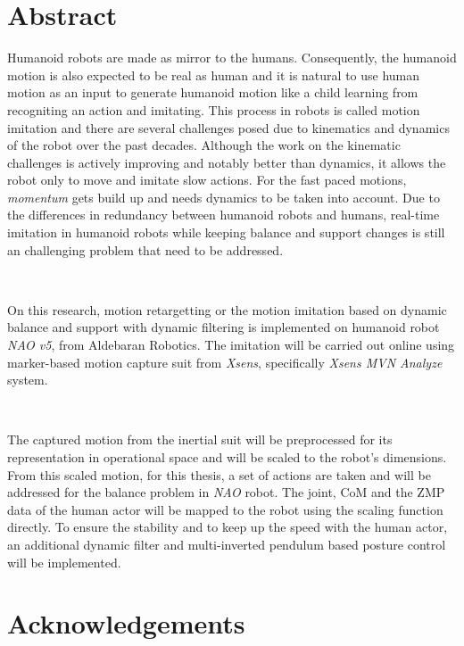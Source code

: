 \documentclass{thesisreport}
\begin{document}
   
 
  \section*{Abstract}
   
  Humanoid robots are made as mirror to the humans. Consequently, the humanoid motion is also expected to be real as 
  human and it is natural to use human motion as an input to generate humanoid motion like a child learning from recogniting
  an action and imitating. This process in robots is called motion imitation and there are several challenges posed 
  due to kinematics and dynamics of the robot over the past decades. Although the work on the kinematic challenges is 
  actively improving and notably better than dynamics, it allows the robot only to move and imitate slow actions. 
  For the fast paced motions, \textit{momentum} gets build up and needs dynamics to be taken into account. Due to the 
  differences in redundancy between humanoid robots and humans, real-time imitation in humanoid robots while keeping 
  balance and support changes is still an challenging problem that need to be addressed.

  ~
  
  On this research, motion retargetting or the motion imitation based on dynamic balance and support with dynamic filtering 
  is implemented on humanoid robot \textit{NAO v5}, from Aldebaran Robotics. The imitation will be carried out 
  online using marker-based motion capture suit from \textit{Xsens}, specifically \textit{Xsens MVN Analyze} system.
  
  ~
  
  The captured motion from the inertial suit will be preprocessed for its representation in operational space and will be 
  scaled to the robot's dimensions. From this scaled motion, for this thesis, a set of actions are taken and will be addressed
  for the balance problem in \textit{NAO} robot. The joint, CoM and the ZMP data of the human actor will be mapped to the robot
  using the scaling function directly. To ensure the stability and to keep up the speed with the human actor, an additional 
  dynamic filter and multi-inverted pendulum based posture control will be implemented. 
 
 \newpage
 
 \section*{Acknowledgements}
 
\end{document}
